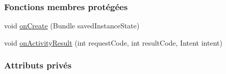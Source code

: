 \subsubsection*{Fonctions membres protégées}
\begin{DoxyCompactItemize}
\item 
void \hyperlink{classfr_1_1campus_1_1laurainc_1_1honeybee_1_1_main_activity_aba2e570bbba3bf1be8487068d9c6c2da}{on\+Create} (Bundle saved\+Instance\+State)
\item 
void \hyperlink{classfr_1_1campus_1_1laurainc_1_1honeybee_1_1_main_activity_ae751b46f1881bda6b3b0e08025a9c044}{on\+Activity\+Result} (int request\+Code, int result\+Code, Intent intent)
\end{DoxyCompactItemize}
\subsubsection*{Attributs privés}
